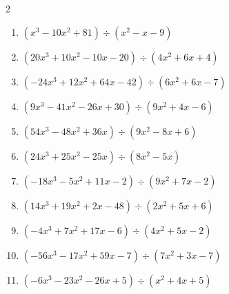 \begin{multicols}{2}
\begin{enumerate}
        \phantom{$商 : 6x-3, \quad 剰余 : -6x+1$}

\columnbreak %

  \item $(x^{3}-10x^{2}+81) \div (x^{2}-x-9)$

        \phantom{$商 : x-9, \quad 剰余 : -6x+8$}

  \item $(20x^{3}+10x^{2}-10x-20) \div (4x^{2}+6x+4)$

        \phantom{$商 : 5x-5, \quad 剰余 : 9x-2$}

  \item $(-24x^{3}+12x^{2}+64x-42) \div (6x^{2}+6x-7)$

        \phantom{$商 : -4x+6, \quad 剰余 : -5x-8$}

  \item $(9x^{3}-41x^{2}-26x+30) \div (9x^{2}+4x-6)$

        \phantom{$商 : x-5, \quad 剰余 : 6x+1$}

  \item $(54x^{3}-48x^{2}+36x) \div (9x^{2}-8x+6)$

        \phantom{$商 : 6x, \quad 剰余 : 3x-2$}

\columnbreak %

\resetques

  \item $(24x^{3}+25x^{2}-25x) \div (8x^{2}-5x)$

        \phantom{$商 : 3x+5, \quad 剰余 : x+4$}

  \item $(-18x^{3}-5x^{2}+11x-2) \div (9x^{2}+7x-2)$

        \phantom{$商 : -2x+1, \quad 剰余 : -x+9$}

  \item $(14x^{3}+19x^{2}+2x-48) \div (2x^{2}+5x+6)$

        \phantom{$商 : 7x-8, \quad 剰余 : 7x+2$}

  \item $(-4x^{3}+7x^{2}+17x-6) \div (4x^{2}+5x-2)$

        \phantom{$商 : -x+3, \quad 剰余 : 6x+9$}

  \item $(-56x^{3}-17x^{2}+59x-7) \div (7x^{2}+3x-7)$

        \phantom{$商 : -8x+1, \quad 剰余 : -7x+5$}

\columnbreak %

  \item $(-6x^{3}-23x^{2}-26x+5) \div (x^{2}+4x+5)$


\end{enumerate}
\end{multicols}
